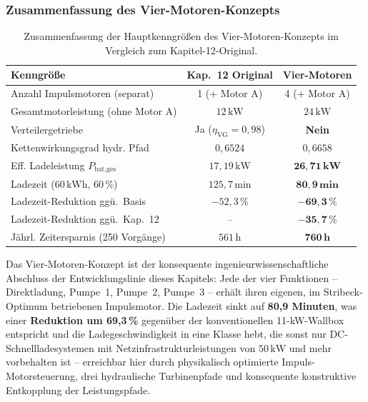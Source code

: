 ﻿\documentclass[a4paper,12pt]{article}
\begin{document}
\subsubsection{Zusammenfassung des Vier-Motoren-Konzepts}

\begin{table}[htbp]
  \centering
  \caption{Zusammenfassung der Hauptkenngrößen des Vier-Motoren-Konzepts
           im Vergleich zum Kapitel-12-Original.}
  \label{tab:vier_motoren_summary}
  \begin{tabular}{lcc}
    \toprule
    \textbf{Kenngröße}
      & \textbf{Kap.~12 Original}
      & \textbf{Vier-Motoren} \\
    \midrule
    Anzahl Impulsmotoren (separat)         & 1 (+ Motor A) & 4 (+ Motor A) \\
    Gesamtmotorleistung (ohne Motor A)     & $12\,\text{kW}$ & $24\,\text{kW}$ \\
    Verteilergetriebe                      & Ja ($\eta_\text{VG}=0{,}98$) & \textbf{Nein} \\
    Kettenwirkungsgrad hydr. Pfad          & $0{,}6524$ & $0{,}6658$ \\
    Eff. Ladeleistung $P_\text{bat,ges}$   & $17{,}19\,\text{kW}$ & $\mathbf{26{,}71\,\text{kW}}$ \\
    Ladezeit ($60\,\text{kWh}$, $60\,\%$) & $125{,}7\,\text{min}$ & $\mathbf{80{,}9\,\text{min}}$ \\
    Ladezeit-Reduktion ggü.\ Basis         & $-52{,}3\,\%$ & $\mathbf{-69{,}3\,\%}$ \\
    Ladezeit-Reduktion ggü.\ Kap.~12      & -- & $\mathbf{-35{,}7\,\%}$ \\
    Jährl. Zeitersparnis (250 Vorgänge)    & $561\,\text{h}$ & $\mathbf{760\,\text{h}}$ \\
    \bottomrule
  \end{tabular}
\end{table}

Das Vier-Motoren-Konzept ist der konsequente ingenieurwissenschaftliche
Abschluss der Entwicklungslinie dieses Kapitels: Jede der vier
Funktionen -- Direktladung, Pumpe~1, Pumpe~2, Pumpe~3 -- erhält
ihren eigenen, im Stribeck-Optimum betriebenen Impulsmotor.
Die Ladezeit sinkt auf \textbf{80{,}9 Minuten}, was einer
\textbf{Reduktion um 69{,}3\,\%} gegenüber der konventionellen
11-kW-Wallbox entspricht und die Ladegeschwindigkeit in eine
Klasse hebt, die sonst nur DC-Schnellladesystemen mit
Netzinfrastrukturleistungen von $50\,\text{kW}$ und mehr
vorbehalten ist -- erreichbar hier durch physikalisch optimierte
Impuls-Motorsteuerung, drei hydraulische Turbinenpfade und
konsequente konstruktive Entkopplung der Leistungspfade.
\end{document}
